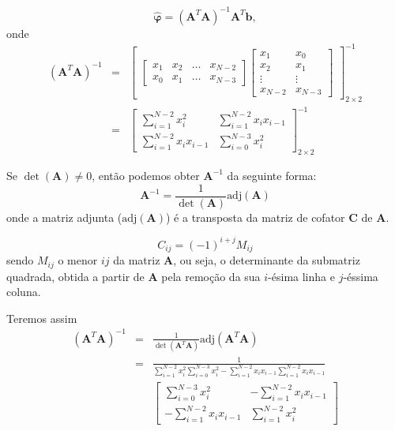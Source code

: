\begin{frame}[allowframebreaks]
  \newpage
  \begin{equation}
  \hat{\mathbf{\varphi}} = (\mathbf{A}^T \mathbf{A})^{-1} \mathbf{A}^T \mathbf{b} ,
  \end{equation}
  onde
  \begin{eqnarray}
  (\mathbf{A}^T \mathbf{A})^{-1} &=& \begin{bmatrix} \begin{bmatrix} x_1 & x_2 & \ldots & x_{N-2} \\ x_0 & x_1 & \ldots & x_{N-3} \end{bmatrix} \begin{bmatrix}x_1 & x_0 \\ x_2 & x_1 \\ \vdots & \vdots \\ x_{N-2} & x_{N-3}\end{bmatrix} \end{bmatrix}^{-1}_{2\times 2} \nonumber \\
  &=& \begin{bmatrix} \sum_{i=1}^{N-2}x_i^2  & \sum_{i=1}^{N-2}x_i x_{i-1} \\ \sum_{i=1}^{N-2} x_i x_{i-1} & \sum_{i=0}^{N-3}x_i^2 \end{bmatrix}^{-1}_{2\times 2}
  \end{eqnarray}

  Se $\det(\mathbf{A}) \neq 0$, então podemos obter $\mathbf{A}^{-1}$ da seguinte forma:
  \begin{equation}
        \mathbf{A}^{-1} = \frac{1}{\det(\mathbf{A})} \text{adj}(\mathbf{A})
  \end{equation}
  onde a matriz adjunta ($\text{adj}(\mathbf{A})$) é a transposta da
  matriz de cofator $\mathbf{C}$ de $\mathbf{A}$.
  
  \begin{equation}
        C_{ij} = (-1)^{i+j} M_{ij}
  \end{equation}
  sendo $M_{ij}$ o menor $ij$ da matriz $\mathbf{A}$, ou seja, 
  o determinante da submatriz quadrada, obtida a partir de $\mathbf{A}$ 
  pela remoção da sua $i$-ésima linha e $j$-éssima coluna. 
  
  Teremos assim
  \begin{eqnarray}
  (\mathbf{A}^T \mathbf{A})^{-1} &=& \frac{1}{\det(\mathbf{A}^T \mathbf{A})} \text{adj}(\mathbf{A}^T \mathbf{A}) \nonumber \\
  &=& \frac{1}{\sum_{i=1}^{N-2}x_i^2 \sum_{i=0}^{N-3}x_i^2 - \sum_{i=1}^{N-2}x_i x_{i-1} \sum_{i=1}^{N-2} x_i x_{i-1}} \nonumber \\
  & & \begin{bmatrix} \sum_{i=0}^{N-3} x_i^2 & -\sum_{i=1}^{N-2} x_i x_{i-1} \\ -\sum_{i=1}^{N-2}x_i x_{i-1} & \sum_{i=1}^{N-2} x_i^2 \end{bmatrix}
  \end{eqnarray}
  

\end{frame}
